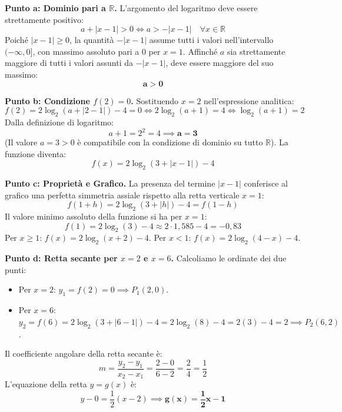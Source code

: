 \documentclass[11pt,a4paper,oneside]{report}
\begin{document}
\begin{dimostrazione}[Svolgimento]
\textbf{Punto a: Dominio pari a $\mathbb{R}$.}
L'argomento del logaritmo deve essere strettamente positivo:
\begin{equation*}
    a + |x - 1| > 0 \iff a > -|x - 1| \quad \forall x \in \mathbb{R}
\end{equation*}
Poiché $|x - 1| \ge 0$, la quantità $-|x - 1|$ assume tutti i valori nell'intervallo $(-\infty, 0]$, con massimo assoluto pari a $0$ per $x = 1$. Affinché $a$ sia strettamente maggiore di tutti i valori assunti da $-|x - 1|$, deve essere maggiore del suo massimo:
\begin{equation}
    \mathbf{a > 0}
\end{equation}

\textbf{Punto b: Condizione $f(2) = 0$.}
Sostituendo $x = 2$ nell'espressione analitica:
\begin{equation*}
    f(2) = 2\log_2(a + |2 - 1|) - 4 = 0 \iff 2\log_2(a + 1) = 4 \iff \log_2(a + 1) = 2
\end{equation*}
Dalla definizione di logaritmo:
\begin{equation*}
    a + 1 = 2^2 = 4 \implies \mathbf{a = 3}
\end{equation*}
(Il valore $a = 3 > 0$ è compatibile con la condizione di dominio su tutto $\mathbb{R}$).
La funzione diventa:
\begin{equation}
    f(x) = 2\log_2(3 + |x - 1|) - 4
\end{equation}

\textbf{Punto c: Proprietà e Grafico.}
La presenza del termine $|x - 1|$ conferisce al grafico una perfetta simmetria assiale rispetto alla retta verticale $x = 1$:
\begin{equation*}
    f(1 + h) = 2\log_2(3 + |h|) - 4 = f(1 - h)
\end{equation*}
Il valore minimo assoluto della funzione si ha per $x = 1$:
\begin{equation*}
    f(1) = 2\log_2(3) - 4 \approx 2 \cdot 1{,}585 - 4 = -0{,}83
\end{equation*}
Per $x \ge 1$: $f(x) = 2\log_2(x + 2) - 4$.
Per $x < 1$: $f(x) = 2\log_2(4 - x) - 4$.

\textbf{Punto d: Retta secante per $x = 2$ e $x = 6$.}
Calcoliamo le ordinate dei due punti:
\begin{itemize}
    \item Per $x = 2$: $y_1 = f(2) = 0 \implies P_1(2, 0)$.
    \item Per $x = 6$: $y_2 = f(6) = 2\log_2(3 + |6-1|) - 4 = 2\log_2(8) - 4 = 2(3) - 4 = 2 \implies P_2(6, 2)$.
\end{itemize}
Il coefficiente angolare della retta secante è:
\begin{equation*}
    m = \frac{y_2 - y_1}{x_2 - x_1} = \frac{2 - 0}{6 - 2} = \frac{2}{4} = \frac{1}{2}
\end{equation*}
L'equazione della retta $y = g(x)$ è:
\begin{equation}
    y - 0 = \frac{1}{2}(x - 2) \implies \mathbf{g(x) = \frac{1}{2}x - 1}
\end{equation}


\end{dimostrazione}
\end{document}
